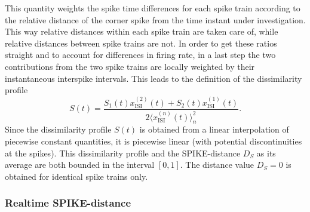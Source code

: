 \documentclass[10pt,twocolumn]{elsart5p}
\begin{document}
\begin{appendix}
This quantity weights the spike time differences for each spike train according to the relative distance of the corner spike from the time instant under investigation. This way relative distances within each spike train are taken care of, while relative distances between spike trains are not. In order to get these ratios straight and to account for differences in firing rate, in a last step the two contributions from the two spike trains are locally weighted by their instantaneous interspike intervals. This leads to the definition of the dissimilarity profile
%
\begin{equation} \label{eq:Bi-Spike-Diss-Improved}
     S (t) = \frac{S_1 (t) x_{\mathrm {ISI}}^{(2)} (t) + S_2 (t) x_{\mathrm {ISI}}^{(1)} (t)}{2 \langle x_{\mathrm {ISI}}^{(n)} (t) \rangle_n^2}.
\end{equation}
%
Since the dissimilarity profile $S (t)$ is obtained from a linear interpolation of piecewise constant quantities, it is piecewise linear (with potential discontinuities at the spikes). This dissimilarity profile and the SPIKE-distance $D_S$ as its average are both bounded in the interval $[0, 1]$. The distance value $D_S = 0$ is obtained for identical spike trains only.



\subsubsection{\label{App-sss:Realtime-Spike-Distance} Realtime SPIKE-distance}


\end{appendix}
\end{document}
